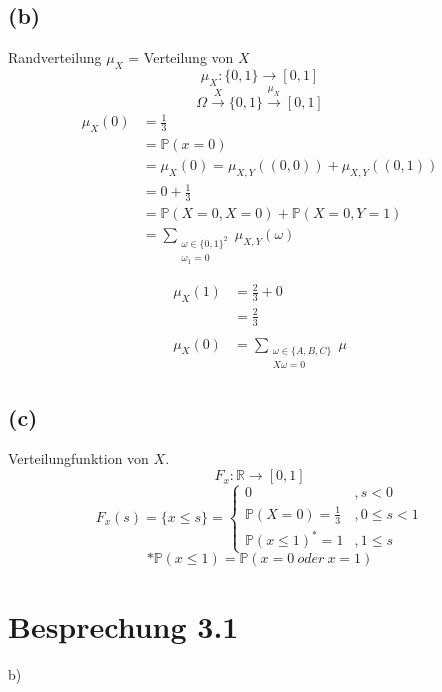 \documentclass{article} %
\newcommand{\p}[0]{\mathbb{P}}
\begin{document}
\subsection*{(b)}
Randverteilung $\mu_X$ = Verteilung von $X$
\[
\mu_X : \{0,1\} \rightarrow [0,1]
\]
\[
\Omega \overset{X}{\rightarrow} \{0,1\} \overset{\mu_X}{\rightarrow} [0,1]
\]
\begin{align*}
    \mu_X(0) & = \frac{1}{3} \\
    & = \p(x=0) \\
    & = \mu_X(0) = \mu_{X,Y} ((0,0)) + \mu_{X,Y}((0,1)) \\
    & = 0+\frac{1}{3} \\
    & =\p (X=0, X=0) + \p (X=0, Y=1) \\
    & = \sum_{\substack{\omega \in \{0,1\}^2 \\ \omega_1 = 0}}  \mu_{X,Y}(\omega) \\ \\
\end{align*}
\begin{align*}
      \mu_X(1) & = \frac{2}{3} + 0 \\
    & = \frac{2}{3} \\ \\
    \mu_X(0) & = \sum_{ \substack{ \omega \in \{A,B,C\}\\ X\omega = 0}}  \mu
\end{align*}
\subsection*{(c)}
Verteilungfunktion von $X$. 
\[
F_x: \mathbb{R} \rightarrow [0,1]
\] 
\[
F_x(s) = \{x \leq s \} = \begin{cases}
0  & , s < 0 \\
\p(X=0) = \frac{1}{3} & , 0 \leq s < 1 \\
\p(x\leq1)^*=1& , 1 \leq s
\end{cases}
\]
\[
* \p(x\leq1) = \p(x=0\ oder\ x =1)
\]

\section*{Besprechung 3.1}
b) 
\[

\]
\end{document}

